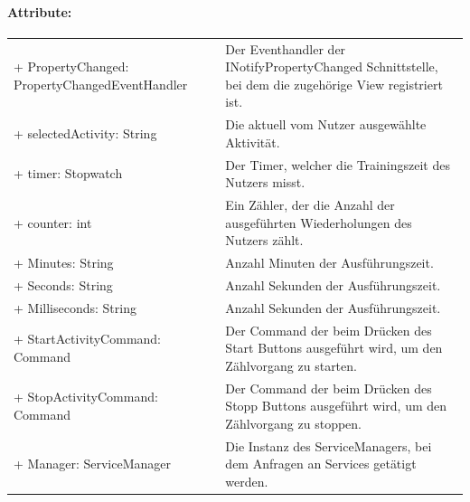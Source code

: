 \documentclass[a4paper,12pt]{article}
\begin{document}
\paragraph{Attribute:}
\begin{tabular}{p{7cm}p{10cm}}
+ PropertyChanged: PropertyChangedEventHandler & Der Eventhandler der INotifyPropertyChanged Schnittstelle, bei dem die zugehörige View registriert ist. \\
+ selectedActivity: String & Die aktuell vom Nutzer ausgewählte Aktivität. \\
+ timer: Stopwatch & Der Timer, welcher die Trainingszeit des Nutzers misst. \\
+ counter: int & Ein Zähler, der die Anzahl der ausgeführten Wiederholungen des Nutzers zählt. \\
+ Minutes: String & Anzahl Minuten der Ausführungszeit. \\
+ Seconds: String & Anzahl Sekunden der Ausführungszeit. \\
+ Milliseconds: String & Anzahl Sekunden der Ausführungszeit. \\ 
+ StartActivityCommand: Command & Der Command der beim Drücken des Start Buttons ausgeführt wird, um den Zählvorgang zu starten. \\
+ StopActivityCommand: Command & Der Command der beim Drücken des Stopp Buttons ausgeführt wird, um den Zählvorgang zu stoppen. \\
+ Manager: ServiceManager & Die Instanz des ServiceManagers, bei dem Anfragen an Services getätigt werden. \\
\end{tabular}
\end{document}
